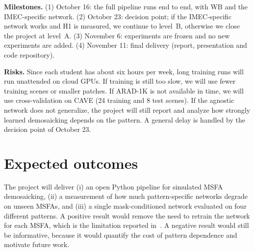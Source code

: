 \documentclass{article}
\begin{document}
\textbf{Milestones.} (1) October 16: the full pipeline runs end to end, with
WB and the IMEC-specific network. (2) October 23: decision point; if the
IMEC-specific network works and H1 is measured, we continue to level~B,
otherwise we close the project at level~A. (3) November 6: experiments are
frozen and no new experiments are added. (4) November 11: final delivery
(report, presentation and code repository).

\textbf{Risks.} Since each student has about six hours per week, long
training runs will run unattended on cloud GPUs. If training is still too
slow, we will use fewer training scenes or smaller patches. If ARAD-1K is not available in time, we
will use cross-validation on CAVE (24 training and 8 test scenes). If the
agnostic network does not generalize, the project will still report and
analyze how strongly learned demosaicking depends on the pattern. A general
delay is handled by the decision point of October 23.

\section{Expected outcomes}
\label{sec:conclusion}

The project will deliver (i) an open Python pipeline for simulated MSFA
demosaicking, (ii) a measurement of how much pattern-specific networks
degrade on unseen MSFAs, and (iii) a single mask-conditioned network
evaluated on four different patterns. A positive result would remove the
need to retrain the network for each MSFA, which is the limitation reported
in~\cite{diaz2023}. A negative result would still be informative, because it
would quantify the cost of pattern dependence and motivate future work.



\end{document}
